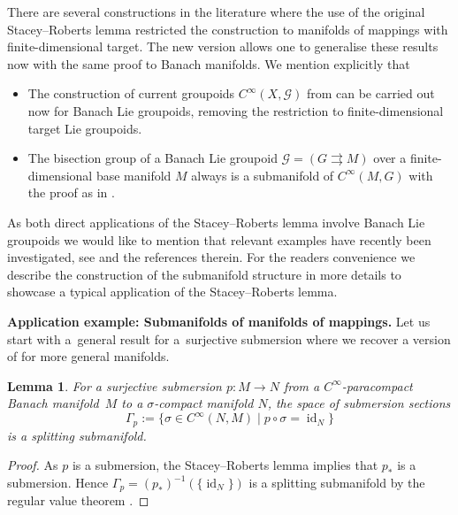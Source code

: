 \documentclass[pdftex]{sigma}
\numberwithin{equation}{section}
\newtheorem{Lemma}[Theorem]{Lemma}
\newcommand{\cG}{\ensuremath{\mathcal{G}}}
\DeclareMathOperator{\id}{id}
\begin{document}
There are several constructions in the literature where the use of the original Stacey--Roberts lemma restricted the construction to manifolds of mappings with finite-dimensional target. The new version allows one to generalise these results now with the same proof to Banach manifolds. We mention explicitly that
\begin{itemize}\itemsep=0pt
\item The construction of current groupoids $C^\infty (X, \cG)$ from \cite[Theorem~3.2]{AaGaS20} can be carried out now for Banach Lie groupoids, removing the restriction to finite-dimensional target Lie groupoids.
\item The bisection group of a Banach Lie groupoid $\cG =(G\rightrightarrows M)$ over a finite-dimensional base manifold $M$ always is a submanifold of $C^\infty (M,G)$ with the proof as in \cite[Theorem~1.3]{AaS19}.
\end{itemize}
As both direct applications of the Stacey--Roberts lemma involve Banach Lie groupoids we would like to mention that relevant examples have recently been investigated, see \cite{BaGaP19,BanGpd23,BanGpd24,HaJ16} and the references therein.
For the readers convenience we describe the construction of the submanifold structure in more details to showcase a typical application of the Stacey--Roberts lemma.

\textbf{Application example: Submanifolds of manifolds of mappings.}
Let us start with a~general result for a~surjective submersion where we recover a version of \cite[Proposition~10.10]{Mic80} for more general manifolds.

\begin{Lemma}\label{lem:sect_submanf} For a surjective submersion $p \colon M \rightarrow N$ from a $C^\infty$-paracompact Banach manifold~$M$ to a $\sigma$-compact manifold $N$, the space of submersion sections
 \begin{displaymath}
 \Gamma_p := \{\sigma \in C^\infty (N,M) \mid p\circ \sigma = \id_N\}
 \end{displaymath}
is a splitting submanifold.
\end{Lemma}

\begin{proof}
As $p$ is a submersion, the Stacey--Roberts lemma implies that $p_\ast$ is a submersion. Hence $\Gamma_p = (p_\ast)^{-1}(\{\id_N\})$ is a splitting submanifold by the regular value theorem \cite[Theorem D]{glo16}.
\end{proof}
\end{document}
